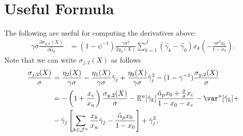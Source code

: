 
\section{Useful Formula} The following are useful for computing the derivatives above:
\begin{align}
\gamma \sigma \frac{\partial \sigma_{y,2}(X)}{\partial \hat{\alpha}_p} &= \left(1-\psi^{-1}\right)\frac{\gamma\sigma^2}{2 y_{0}(X)} \sum_{k=1}^J \left( \hat{\gamma}_k - \hat{\gamma}_0  \right) x_k \left(- \frac{\gamma \sigma^2 x_0}{1-x_0} \right).
\end{align}
Note that we can write $\sigma_{j,2}(X)$ as follows
\begin{align}
\frac{\sigma_{j,2}(X)}{\sigma} &= \frac{\eta_2(X)}{\gamma \sigma} - \frac{\eta_1(X)}{\gamma\sigma}\hat{\gamma}_j + \frac{\eta_0(X)}{\gamma\sigma}\hat{\gamma}_j^2 - (1-\gamma^{-1}) \frac{\sigma_{y,2}(X)}{\sigma}\nonumber\\
&= -\left( 1 + \frac{ x_c}{x_u}\right)\frac{\sigma_{y,2}(X)}{\sigma}-\mathbb{E}^u[\hat{\gamma}_k] \frac{ \hat{\alpha}_p x_0+ \frac{\hat{\sigma}}{\sigma}x_c }{1-x_0-x_c} -\var^u[\hat{\gamma}_k] +\nonumber\\
& - \hat{\gamma}_j \left[\sum_{k\in\mathcal{J}^u} \frac{x_k}{x_u} \hat{\gamma}_j -\frac{\hat{\alpha}_p  x_0}{1-x_0}\right]+\hat{\gamma}_j^2.
\end{align}

